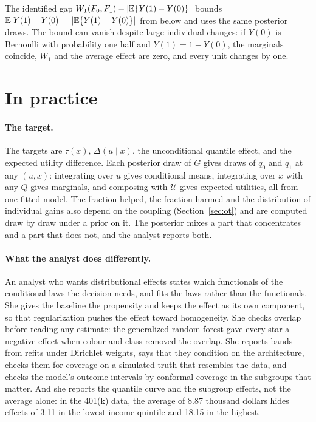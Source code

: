 The identified gap $W_1(F_0, F_1) - |\mathbb{E}\{Y(1) - Y(0)\}|$ bounds $\mathbb{E}|Y(1) - Y(0)| - |\mathbb{E}\{Y(1) - Y(0)\}|$ from below and uses the same posterior draws. The bound can vanish despite large individual changes: if $Y(0)$ is Bernoulli with probability one half and $Y(1) = 1 - Y(0)$, the marginals coincide, $W_1$ and the average effect are zero, and every unit changes by one.

\section{In practice}

\paragraph{The target.} The targets are $\tau(x)$, $\Delta(u \mid x)$, the unconditional quantile effect, and the expected utility difference. Each posterior draw of $G$ gives draws of $q_0$ and $q_1$ at any $(u, x)$: integrating over $u$ gives conditional means, integrating over $x$ with any $Q$ gives marginals, and composing with $\mathcal{U}$ gives expected utilities, all from one fitted model. The fraction helped, the fraction harmed and the distribution of individual gains also depend on the coupling (Section~\ref{sec:ot}) and are computed draw by draw under a prior on it. The posterior mixes a part that concentrates and a part that does not, and the analyst reports both.

\paragraph{What the analyst does differently.} An analyst who wants distributional effects states which functionals of the conditional laws the decision needs, and fits the laws rather than the functionals. She gives the baseline the propensity and keeps the effect as its own component, so that regularization pushes the effect toward homogeneity. She checks overlap before reading any estimate: the generalized random forest gave every star a negative effect when colour and class removed the overlap. She reports bands from refits under Dirichlet weights, says that they condition on the architecture, checks them for coverage on a simulated truth that resembles the data, and checks the model's outcome intervals by conformal coverage in the subgroups that matter. And she reports the quantile curve and the subgroup effects, not the average alone: in the 401(k) data, the average of 8.87 thousand dollars hides effects of 3.11 in the lowest income quintile and 18.15 in the highest.

